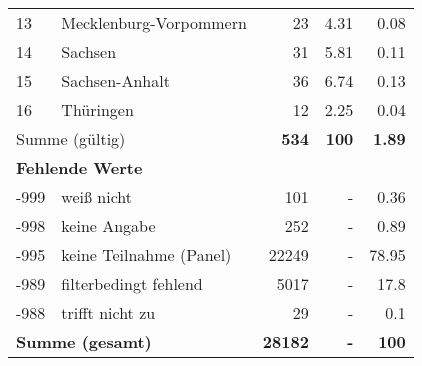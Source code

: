\begin{longtable}{lXrrr}
     13 &
     \multicolumn{1}{X}{ Mecklenburg-Vorpommern   } &


       \num{23} &
       \num[round-mode=places,round-precision=2]{4.31} &
         \num[round-mode=places,round-precision=2]{0.08} \\

     14 &
     \multicolumn{1}{X}{ Sachsen   } &


       \num{31} &
       \num[round-mode=places,round-precision=2]{5.81} &
         \num[round-mode=places,round-precision=2]{0.11} \\

     15 &
     \multicolumn{1}{X}{ Sachsen-Anhalt   } &


       \num{36} &
       \num[round-mode=places,round-precision=2]{6.74} &
         \num[round-mode=places,round-precision=2]{0.13} \\

     16 &
     \multicolumn{1}{X}{ Thüringen   } &


       \num{12} &
       \num[round-mode=places,round-precision=2]{2.25} &
         \num[round-mode=places,round-precision=2]{0.04} \\
     \midrule
     \multicolumn{2}{l}{Summe (gültig)} &
       \textbf{\num{534}} &
     \textbf{100} &
       \textbf{\num[round-mode=places,round-precision=2]{1.89}} \\
     \multicolumn{5}{l}{\textbf{Fehlende Werte}}\\
       -999 &
       weiß nicht &
         \num{101} &
        - &
         \num[round-mode=places,round-precision=2]{0.36} \\
       -998 &
       keine Angabe &
         \num{252} &
        - &
         \num[round-mode=places,round-precision=2]{0.89} \\
       -995 &
       keine Teilnahme (Panel) &
         \num{22249} &
        - &
         \num[round-mode=places,round-precision=2]{78.95} \\
       -989 &
       filterbedingt fehlend &
         \num{5017} &
        - &
         \num[round-mode=places,round-precision=2]{17.8} \\
       -988 &
       trifft nicht zu &
         \num{29} &
        - &
         \num[round-mode=places,round-precision=2]{0.1} \\
     \midrule
     \multicolumn{2}{l}{\textbf{Summe (gesamt)}} &
          \textbf{\num{28182}} &
        \textbf{-} &
        \textbf{100} \\
     \bottomrule
     \end{longtable}
     
